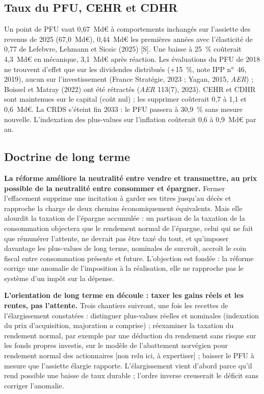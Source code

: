 \subsection{Taux du PFU, CEHR et CDHR}

Un point de PFU vaut 0,67~Md€ à comportements inchangés sur l'assiette des revenus de 2025 (67,0~Md€), 0,44~Md€ les
premières années avec l'élasticité de 0,77 de Lefebvre, Lehmann et Sicsic (2025) [S]. Une baisse à 25~\% coûterait
4,3~Md€ en mécanique, 3,1~Md€ après réaction. Les évaluations du PFU de 2018 ne trouvent d'effet que sur les dividendes
distribués (+15~\%, note IPP n°~46, 2019), aucun sur l'investissement (France Stratégie, 2023 ; Yagan, 2015, \emph{AER}) ;
Boissel et Matray (2022) ont été rétractés (\emph{AER} 113(7), 2023). CEHR et CDHR sont maintenues sur le capital
(coût nul) ; les supprimer coûterait 0,7 à 1,1 et 0,6~Md€. La CRDS s'éteint fin 2033 : le PFU passera à 30,9~\% sans
mesure nouvelle. L'indexation des plus-values sur l'inflation coûterait 0,6 à 0,9~Md€ par an.

\subsection{Doctrine de long terme}

\textbf{La réforme améliore la neutralité entre vendre et transmettre, au prix possible de la neutralité entre
consommer et épargner.} Fermer l'effacement supprime une incitation à garder ses titres jusqu'au décès et rapproche la
charge de deux chemins économiquement équivalents. Mais elle alourdit la taxation de l'épargne accumulée : un partisan
de la taxation de la consommation objectera que le rendement normal de l'épargne, celui qui ne fait que rémunérer
l'attente, ne devrait pas être taxé du tout, et qu'imposer davantage les plus-values de long terme, nominales de
surcroît, accroît le coin fiscal entre consommation présente et future. L'objection est fondée : la réforme corrige une
anomalie de l'imposition à la réalisation, elle ne rapproche pas le système d'un impôt sur la dépense.

\textbf{L'orientation de long terme en découle : taxer les gains réels et les rentes, pas l'attente.} Trois chantiers
suivront, une fois les recettes de l'élargissement constatées : distinguer plus-values réelles et nominales (indexation
du prix d'acquisition, majoration $a$ comprise) ; réexaminer la taxation du rendement normal, par exemple par une
déduction du rendement sans risque sur les fonds propres investis, sur le modèle de l'abattement norvégien pour
rendement normal des actionnaires [non relu ici, à expertiser] ; baisser le PFU à mesure que l'assiette élargie rapporte. L'élargissement vient
d'abord parce qu'il rend possible une baisse de taux durable ; l'ordre inverse creuserait le déficit sans corriger
l'anomalie.


